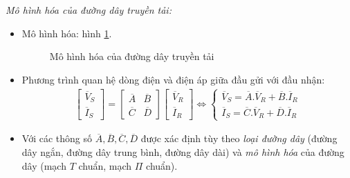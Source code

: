 	\emph{Mô hình hóa của đường dây truyền tải:}
		\begin{itemize}		
			\item Mô hình hóa: hình \ref{Fig:mo-hinh-hoa-duong-day}.
			\begin{figure}[!h]
				\begin{center}
			\end{center}
			\caption{Mô hình hóa của đường dây truyền tải} \label{Fig:mo-hinh-hoa-duong-day}
		\end{figure}
		
		\item Phương trình quan hệ dòng điện và điện áp giữa đầu gửi với đầu nhận:
			\begin{align*}
				\left[{\begin{array}{c}
				\overline{V}_S\\
				\overline{I}_S
				\end{array}
				}\right]
				= 
				\left[{\begin{array}{cc}
				\overline{A} & \overline{B}\\
				\overline{C} & \overline{D}
				\end{array}
				}\right]				
				\left[{\begin{array}{c}
				\overline{V}_R\\
				\overline{I}_R
				\end{array}
				}\right]
				\Longleftrightarrow
				 \left\{{\begin{array}{c}
				 \overline{V}_S = \overline{A}.\overline{V}_R + \overline{B}.\overline{I}_R\\
				 \overline{I}_S = \overline{C}.\overline{V}_R + \overline{D}.\overline{I}_R
				 \end{array}
				}\right.
			\end{align*}
			
		\item Với các thông số $\overline{A}, \overline{B}, \overline{C}, \overline{D}$ được xác  định tùy theo \emph{loại đường dây} (đường dây ngắn, đường dây trung bình, đường dây dài) và  \emph{mô hình hóa} của đường dây (mạch $T$ chuẩn, mạch $\Pi$ chuẩn).
	\end{itemize}

